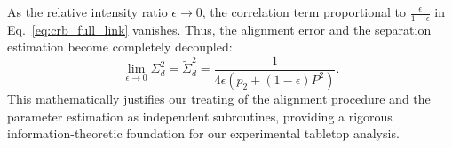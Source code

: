 As the relative intensity ratio $\epsilon \to 0$, the correlation term proportional to $\frac{\epsilon}{1-\epsilon}$ in Eq.~\eqref{eq:crb_full_link} vanishes. Thus, the alignment error and the separation estimation become completely decoupled:
\begin{equation}
    \lim_{\epsilon \to 0} \Sigma^2_d = \tilde{\Sigma}^2_d = \frac{1}{4\epsilon (p_2 + (1-\epsilon)P^2)}.
    \label{eq:decoupled_crb_link}
\end{equation}
This mathematically justifies our treating of the alignment procedure and the parameter estimation as independent subroutines, providing a rigorous information-theoretic foundation for our experimental tabletop analysis.

